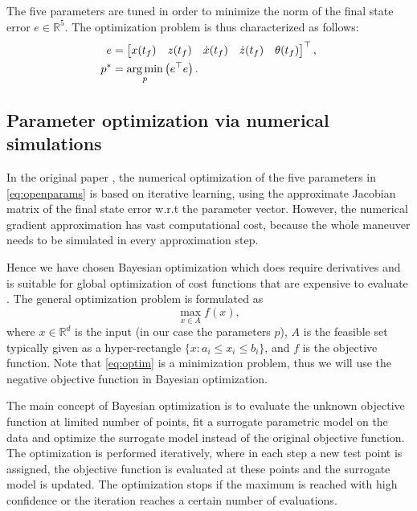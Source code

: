 The five parameters are tuned in order to minimize the norm of the final state error $e\in\mathbb{R}^5$. The optimization problem is thus characterized as follows:
\begin{subequations}\label{eq:optim}
\begin{align}
e &= \begin{bmatrix}
x(t_f) & z(t_f) & \dot{x}(t_f) & \dot{z}(t_f)& \theta(t_f)
\end{bmatrix}^\top,\\
p^* &= \operatorname*{arg\,min}_p \left(e^\top e\right).
\end{align} 
\end{subequations}

\subsection{Parameter optimization via numerical simulations}

In the original paper \cite{LSICRA2010}, the numerical optimization of the five parameters in \eqref{eq:openparams} is based on iterative learning, using the approximate Jacobian matrix of the final state error w.r.t the parameter vector. However, the numerical gradient approximation has vast computational cost, because the whole maneuver needs to be simulated in every approximation step. 

Hence we have chosen Bayesian optimization which does require derivatives and is suitable for global optimization of cost functions that are expensive to evaluate \cite{frazier2018tutorial, bayesopt2, brochu2010tutorial}. The general optimization problem is formulated as
\begin{equation}
    \max_{x\in A} f(x),
\end{equation}
where $x\in \mathbb{R}^d$ is the input (in our case the parameters $p$), $A$ is the feasible set typically given as a hyper-rectangle $\{x:a_i\leq x_i \leq b_i\}$, and $f$ is the objective function. Note that \eqref{eq:optim} is a minimization problem, thus we will use the negative objective function in Bayesian optimization.

The main concept of Bayesian optimization is to evaluate the unknown objective function at limited number of points, fit a surrogate parametric model on the data and optimize the surrogate model instead of the original objective function. The optimization is performed iteratively, where in each step a new test point is assigned, the objective function is evaluated at these points and the surrogate model is updated. The optimization stops if the maximum is reached with high confidence or the iteration reaches a certain number of evaluations. 

